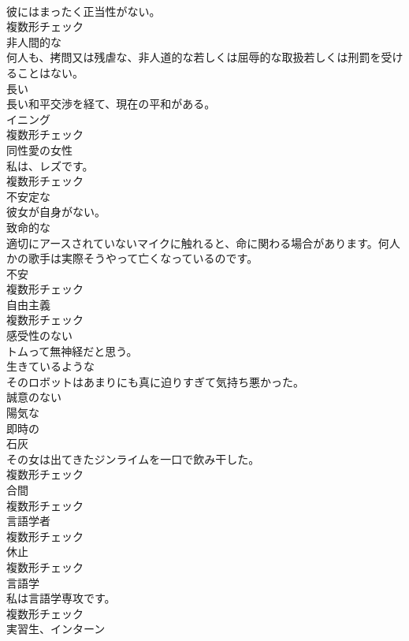 \documentclass[8pt]{extreport}
\begin{document}
\begin{CJK}{UTF8}{min}
\\	彼にはまったく正当性がない。	
\\	複数形チェック
\\	[形容詞]	非人間的な	
\\	何人も、拷問又は残虐な、非人道的な若しくは屈辱的な取扱若しくは刑罰を受けることはない。	
\\	[形容詞]	⻑い	
\\	長い和平交渉を経て、現在の平和がある。	
\\	[名詞]	イニング	
\\	複数形チェック
\\	[名詞]	同性愛の女性	
\\	私は、レズです。	
\\	複数形チェック
\\	[形容詞]	不安定な	
\\	彼女が自身がない。	
\\	[形容詞]	致命的な	
\\	適切にアースされていないマイクに触れると、命に関わる場合があります。何人かの歌手は実際そうやって亡くなっているのです。	
\\	[名詞]	不安	
\\	複数形チェック
\\	[名詞]	自由主義	
\\	複数形チェック
\\	[形容詞]	感受性のない	
\\	トムって無神経だと思う。	
\\	[形容詞]	生きているような	
\\	そのロボットはあまりにも真に迫りすぎて気持ち悪かった。	
\\	[形容詞]	誠意のない	
\\	[形容詞]	陽気な	
\\	[形容詞]	即時の	
\\	[名詞]	石灰	
\\	その女は出てきたジンライムを一口で飲み干した。	
\\	複数形チェック
\\	[名詞]	合間	
\\	複数形チェック
\\	[名詞]	言語学者	
\\	複数形チェック
\\	[名詞]	休止	
\\	複数形チェック
\\	[名詞]	言語学	
\\	私は言語学専攻です。	
\\	複数形チェック
\\	[名詞]	実習生、インターン	

\end{CJK}
\end{document}
